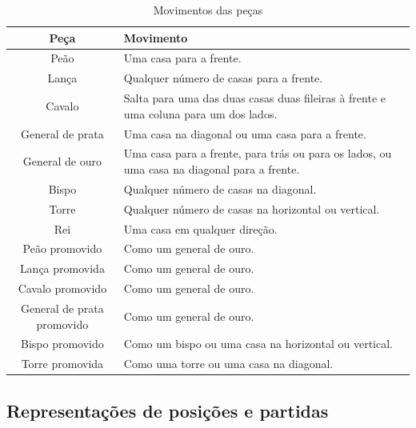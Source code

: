 \documentclass[a4paper, 11pt]{article}
\begin{document}
    \begin{table}[H]
        \centering
        \caption{Movimentos das peças}
        \label{tab:pieces_movements}
        \begin{tabular}{c p{9cm}}
            \toprule
            \textbf{Peça} & \textbf{Movimento}\\
            \midrule
            Peão & Uma casa para a frente. \\
            Lança & Qualquer número de casas para a frente. \\
            Cavalo & Salta para uma das duas casas duas fileiras à frente e uma coluna para um dos lados. \\
            General de prata & Uma casa na diagonal ou uma casa para a frente. \\
            General de ouro & Uma casa para a frente, para trás ou para os lados, ou uma casa na diagonal para a frente. \\
            Bispo & Qualquer número de casas na diagonal. \\
            Torre & Qualquer número de casas na horizontal ou vertical. \\
            Rei & Uma casa em qualquer direção. \\
            Peão promovido & Como um general de ouro. \\
            Lança promovida & Como um general de ouro. \\
            Cavalo promovido & Como um general de ouro. \\
            General de prata promovido & Como um general de ouro. \\
            Bispo promovido & Como um bispo ou uma casa na horizontal ou vertical. \\
            Torre promovida & Como uma torre ou uma casa na diagonal. \\
            \bottomrule
        \end{tabular}
    \end{table}
    \subsection{Representações de posições e partidas}
\end{document}
